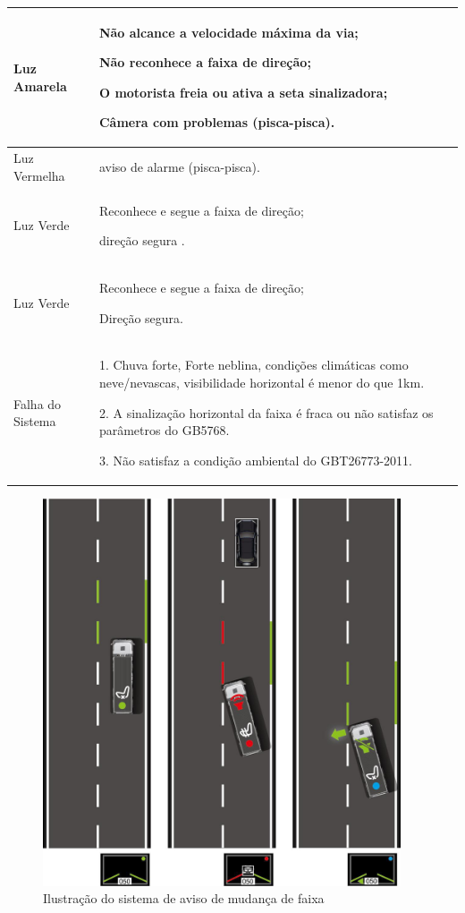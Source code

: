 \begin{enumerate}
\begin{table}[ht]
\begin{tabular}{| l |  p{10cm} |}
\hline
Luz Amarela & Não alcance a velocidade máxima da via;

Não reconhece a faixa de direção;

O motorista freia ou ativa a seta sinalizadora;

Câmera com problemas (pisca-pisca).\\
\hline
Luz Vermelha & aviso de alarme (pisca-pisca).\\
\hline
Luz Verde & Reconhece e segue a faixa de direção;

direção segura .\\
\hline
Luz Verde & Reconhece e segue a faixa de direção;

Direção segura.\\
\hline
Falha do Sistema & 1. Chuva forte, Forte neblina, condições climáticas como neve/nevascas, visibilidade horizontal é menor do que 1km.

2. A sinalização horizontal da faixa é fraca ou não satisfaz os parâmetros do GB5768.

3. Não satisfaz a condição ambiental do GBT26773-2011.
\\
\hline
\end{tabular}
\label{table:funcionamento_aws650}
\end{table}

\begin{figure}[h]
  \centering
  \includegraphics[width=400px, scale=1]{figuras/aviso_mudanca_faixa}
  \caption{Ilustração do sistema de aviso de mudança de faixa}
\label{fig:aviso_mudanca_faixa}
\end{figure}


\end{enumerate}
